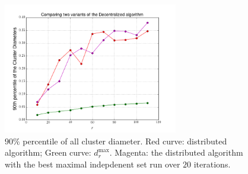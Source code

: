 \begin{figure}[h]
\begin{center}
\includegraphics[width=3in]{figs/90thpercentile_1500cars.png}
\caption{$90\%$ percentile of all cluster diameter. 
Red curve: distributed algorithm; Green curve: $d_{r}^{\max}$. Magenta: the distributed algorithm with the best maximal indepdenent set run over $20$ iterations.}\label{fig:large-90}
\end{center}
\end{figure}












%






